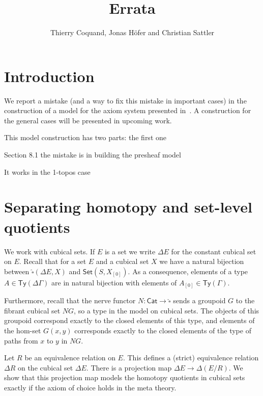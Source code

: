 \documentclass[10pt,a4paper]{article}
\newcommand{\Cat}{\mathsf{Cat}}
\newcommand{\Set}{\mathsf{Set}}
\newcommand\Ty{\mathsf{Ty}}
\begin{document}
\title{Errata}

\author{Thierry Coquand, Jonas H\"ofer and Christian Sattler}
\date{}
\maketitle


\section*{Introduction}

We report a mistake (and a way to fix this mistake in important cases) in the construction of a model for the axiom system presented in~\cite{draft}.
A construction for the general cases will be presented in upcoming work.

This model construction has two parts: the first one

Section 8.1 the mistake is in building the presheaf model

It works in the 1-topos case

\section{Separating homotopy and set-level quotients}

We work with cubical sets.
If $E$ is a set we write $\Delta E$ for the constant cubical set on $E$.
Recall that for a set $E$ and a cubical set $X$ we have a natural bijection between $\widehat{\square}(\Delta E, X)$ and $\Set(S, X_{[0]})$.
As a consequence, elements of a type $A \in \Ty(\Delta\Gamma)$ are in natural bijection with elements of $A_{[0]} \in \Ty(\Gamma)$.

Furthermore, recall that the nerve functor $N \colon \Cat \to \widehat{\square}$ sends a groupoid $G$ to the fibrant cubical set $NG$, so a type in the model on cubical sets.
The objects of this groupoid correspond exactly to the closed elements of this type, and elements of the hom-set $G(x, y)$ corresponds exactly to the closed elements of the type of paths from $x$ to $y$ in $NG$.

Let $R$ be an equivalence relation on $E$.
This defines a (strict) equivalence relation $\Delta R$ on the cubical set $\Delta E$.
There is a projection map $\Delta E \rightarrow \Delta (E/R)$.
We show that this projection map models the homotopy quotients in cubical sets exactly if the axiom of choice holds in the meta theory.
\end{document}
